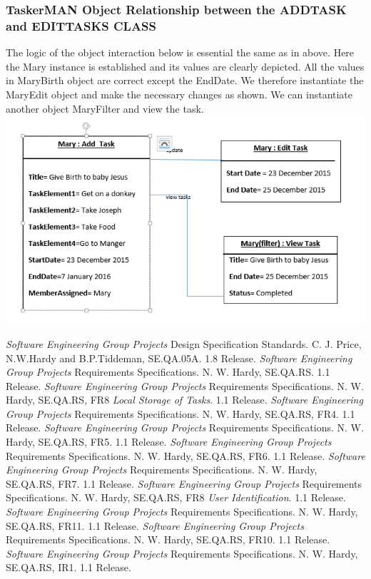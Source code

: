 \documentclass{project}
\begin{document}
\subsubsection{TaskerMAN Object Relationship between the ADD\textunderscore TASK and EDIT\textunderscore TASKS CLASS}
The logic of the object interaction below is essential the same as in above. Here the Mary instance is established and its values are clearly depicted.  All the values in MaryBirth object are correct except the EndDate.  We therefore instantiate the MaryEdit object and make the necessary changes as shown. We can instantiate another object MaryFilter and view the task. \\
\includegraphics[width=1\textwidth, center]{images/Detailed-Design/TaskerMANObjectDiagram2} \\
\begin{thebibliography}{12}
 \emph{Software Engineering Group Projects}
Design Specification Standards.
C. J. Price, N.W.Hardy and B.P.Tiddeman, SE.QA.05A. 1.8 Release.
 \emph{Software Engineering Group Projects}
Requirements Specifications.
N. W. Hardy, SE.QA.RS. 1.1 Release.
 \emph{Software Engineering Group Projects}
Requirements Specifications.
N. W. Hardy, SE.QA.RS, FR8 \emph{Local Storage of Tasks}. 1.1 Release.
 \emph{Software Engineering Group Projects}
Requirements Specifications.
N. W. Hardy, SE.QA.RS, FR4. 1.1 Release.
 \emph{Software Engineering Group Projects}
Requirements Specifications.
N. W. Hardy, SE.QA.RS, FR5. 1.1 Release.
 \emph{Software Engineering Group Projects}
Requirements Specifications.
N. W. Hardy, SE.QA.RS, FR6. 1.1 Release.
 \emph{Software Engineering Group Projects}
Requirements Specifications.
N. W. Hardy, SE.QA.RS, FR7. 1.1 Release.
 \emph{Software Engineering Group Projects}
Requirements Specifications.
N. W. Hardy, SE.QA.RS, FR8 \emph{User Identification}. 1.1 Release.
 \emph{Software Engineering Group Projects}
Requirements Specifications.
N. W. Hardy, SE.QA.RS, FR11. 1.1 Release.
 \emph{Software Engineering Group Projects}
Requirements Specifications.
N. W. Hardy, SE.QA.RS, FR10. 1.1 Release.
 \emph{Software Engineering Group Projects}
Requirements Specifications.
N. W. Hardy, SE.QA.RS, IR1. 1.1 Release.
\end{thebibliography}
\clearpage
{}
\end{document}
